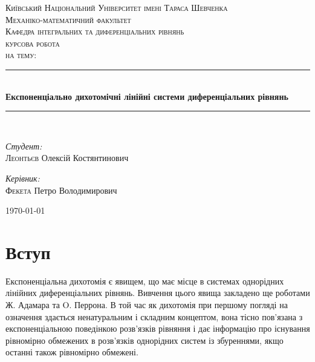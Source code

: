 \documentclass[14pt]{extarticle} %
\newcommand{\HRule}{\rule{\linewidth}{0.5mm}}
\theoremstyle{remark}
\begin{document}
\begin{titlepage}
	\addtolength{\voffset}{-3cm}
	\setlength{\footskip}{5.5cm}
	\thispagestyle{fancy}
	\begin{center}
		\textsc{\Large Київський Національний Університет імені Тараса Шевченка}\\[0.5cm]
		\textsc{\Large Механіко-математичний факультет}\\[0.5cm]
		\textsc{\Large Кафедра інтегральних та диференціальних рівнянь}\\[1.5cm]

		\textsc{\Large курсова робота}\\
		\textsc{\Large на тему:}\\[0.5cm]

		\HRule \\[0.4cm]
		{ \huge \bfseries Експоненціально дихотомічні лінійні системи диференціальних рівнянь}\\[0.4cm]

		\HRule \\[1.5cm]

		\begin{minipage}{0.4\textwidth}
			\begin{flushleft} \large
				\emph{Студент:}\\
				\textsc{Леонтьєв} Олексій Костянтинович
			\end{flushleft}
		\end{minipage}
		\begin{minipage}{0.4\textwidth}
			\begin{flushright} \large
				\emph{Керівник:} \\
				\textsc{Фекета} Петро Володимирович
			\end{flushright}
		\end{minipage}

		\vfill

		{\large \today}
	\end{center}
\end{titlepage}
\tableofcontents
\section*{Вступ}
Експоненціальна дихотомія є явищем, що має місце в системах однорідних лінійних диференціальних рівнянь. Вивчення цього явища
закладено ще роботами Ж. Адамара та O. Перрона. В той час як дихотомія при першому погляді на означення здається ненатуральним
і складним концептом, вона тісно пов’язана з експоненціальною поведінкою розв’язків рівняння і дає інформацію про існування рівномірно обмежених
в розв’язків однорідних систем із збуреннями, якщо останні також рівномірно обмежені.
\end{document}
